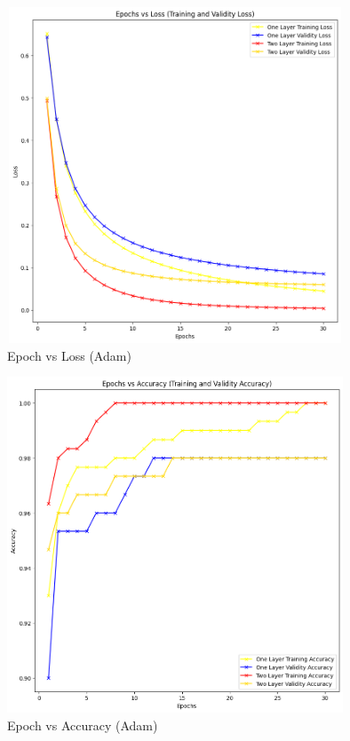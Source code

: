 \documentclass[10pt]{article}
\begin{document}
\begin{figure}[ht]
    \centering
    \includegraphics[width= 10cm, height = 10cm]{images/4l_1.png}
    \caption{Epoch vs Loss (Adam)}
    \label{fig:enter-label}
\end{figure} 

\begin{figure}[ht]
    \centering
    \includegraphics[width= 10cm, height = 10cm]{images/4l_2.png}
    \caption{Epoch vs Accuracy (Adam)}
    \label{fig:enter-label}
\end{figure} 
\end{document}
